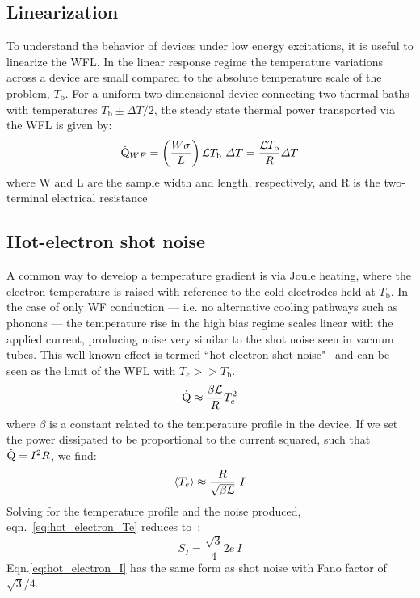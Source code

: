 \subsection{Linearization}
To understand the behavior of devices under low energy excitations, it is useful to linearize the WFL. In the linear response regime the temperature variations across a device are small compared to the absolute temperature scale of the problem, $T_\mathrm{b}$. For a uniform two-dimensional device connecting two thermal baths with temperatures $T_\mathrm{b} \pm\Delta T/2$, the steady state thermal power transported via the WFL is given by:
\begin{equation}\label{eq:QWF}
\dot{\mathrm{Q}}_{WF} = \left(\frac{W\sigma}{L}\right)\mathcal{L} T_\mathrm{b}~\Delta T = \frac{\mathcal{L} T_\mathrm{b}}{R}\Delta T
\end{equation}
where W and L are the sample width and length, respectively, and R is the two-terminal electrical resistance
\subsection{Hot-electron shot noise}
A common way to develop a temperature gradient is via Joule heating, where the electron temperature is raised with reference to the cold electrodes held at $T_\mathrm{b}$. In the case of only WF conduction --- i.e. no alternative cooling pathways such as phonons --- the temperature rise in the high bias regime scales linear with the applied current, producing noise very similar to the shot noise seen in vacuum tubes. This well known effect is termed ``hot-electron shot noise"~\cite{steinbach_observation_1996, blanter_shot_2000, de_jong_semiclassical_1996} and can be seen as the limit of the WFL with $T_e >> T_\mathrm{b}$.
\begin{equation}\label{eq:hot_electron_Q}
\dot{\mathrm{Q}} \approx \frac{\beta\mathcal{L}}{R}T_e^2
\end{equation}
where $\beta$ is a constant related to the temperature profile in the device. If we set the power dissipated to be proportional to the current squared, such that $\dot{\mathrm{Q}} = I^2R$, we find:
\begin{equation}\label{eq:hot_electron_Te}
\langle T_e\rangle \approx \frac{R}{\sqrt{\beta\mathcal{L}}}~I
\end{equation}
Solving for the temperature profile and the noise produced, eqn.~\ref{eq:hot_electron_Te} reduces to~\cite{steinbach_observation_1996}:
\begin{equation}\label{eq:hot_electron_I}
S_I = \frac{\sqrt{3}}{4}2e~I
\end{equation}
Eqn.\ref{eq:hot_electron_I} has the same form as shot noise with Fano factor of $\sqrt{3}/4$.

